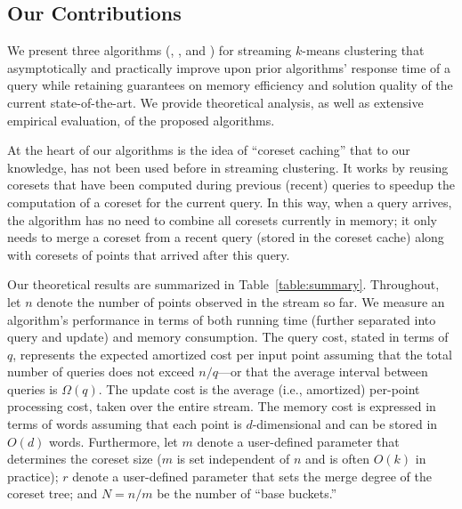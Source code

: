 \subsection{Our Contributions}
We present three algorithms (\cc{}, \rcc{}, and \hybrid{}) for
streaming $k$-means clustering that asymptotically and practically improve upon
prior algorithms' response time of a query while retaining guarantees on memory
efficiency and solution quality of the current state-of-the-art.  We provide
theoretical analysis, as well as extensive empirical evaluation, of the proposed
algorithms.

At the heart of our algorithms is the idea of ``coreset caching'' that to our
knowledge, has not been used before in streaming clustering. It works by reusing
coresets that have been computed during previous (recent) queries to speedup the
computation of a coreset for the current query. In this way, when a query
arrives, the algorithm has no need to combine all coresets currently in memory;
it only needs to merge a coreset from a recent query (stored in the coreset
cache) along with coresets of points that arrived after this
query.



Our theoretical results are summarized in Table~\ref{table:summary}.
Throughout, let $n$ denote the number of points observed in the stream so far.
We measure an algorithm's performance in terms of both running time (further
separated into query and update) and memory consumption.  The query cost, stated
in terms of $q$, represents the expected amortized cost per input point assuming
that the total number of queries does not exceed $n/q$---or that the average
interval between queries is $\Omega(q)$. The update cost is the average (i.e.,
amortized) per-point processing cost, taken over the entire stream.  The memory
cost is expressed in terms of words assuming that each point is $d$-dimensional
and can be stored in $O(d)$ words.  Furthermore, let $m$ denote a user-defined
parameter that determines the coreset size ($m$ is set independent of $n$ and is
often $O(k)$ in practice); $r$ denote a user-defined parameter that sets the
merge degree of the coreset tree; and $N = n/m$ be the number of ``base
buckets.''

